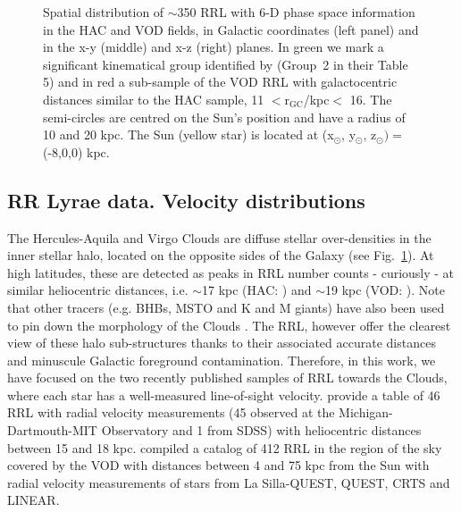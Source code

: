 \documentclass[a4paper,useAMS,usenatbib]{mnras}
\begin{document}
\begin{figure}
	\vspace{-0.55cm}
    \caption{Spatial distribution of $\sim$350 RRL with 6-D phase
      space information in the HAC and VOD fields, in Galactic
      coordinates (left panel) and in the x-y (middle) and x-z (right)
      planes. In green we mark a significant kinematical group
      identified by \citet{Vivas2016} (Group~2 in their Table 5) and
      in red a sub-sample of the VOD RRL with galactocentric distances
      similar to the HAC sample, 11 $<\mathrm{r_{GC}}$/kpc$<$
      16. The semi-circles are centred on the Sun's position and have
      a radius of 10 and 20 kpc. The Sun (yellow star) is located at
      (x$_{\odot}$, y$_{\odot}$, z$_{\odot})= $ (-8,0,0) kpc.}
    \label{fig:lb}
\end{figure}
%
\subsection{RR Lyrae data. Velocity distributions}
%
The Hercules-Aquila and Virgo Clouds are diffuse stellar
over-densities in the inner stellar halo, located on the opposite
sides of the Galaxy (see Fig.~\ref{fig:lb}). At high latitudes,
these are detected as peaks in RRL number counts - curiously - at
similar heliocentric distances, i.e. $\sim$17 kpc (HAC:
\citealt{Wa09,Simion2014}) and $\sim$19 kpc (VOD: \citealt{Vivas2006,
  Duffau2014, Vivas2016}). Note that other tracers (e.g. BHBs, MSTO
and K and M giants) have also been used to pin down the morphology of
the Clouds \citep[see
  e.g.][]{Be07,Juric2008,Sharma2010,Bonaca2012,Conroy2018}. The RRL, however offer the clearest view of these halo sub-structures
thanks to their associated accurate distances and minuscule Galactic
foreground contamination. Therefore, in this work, we have focused on
the two recently published samples of RRL towards the Clouds,
where each star has a well-measured line-of-sight
velocity. \citet{Simion2018} provide a table of 46 RRL with radial
velocity measurements (45 observed at the Michigan-Dartmouth-MIT
Observatory and 1 from SDSS) with heliocentric distances between 15
and 18 kpc. \cite{Vivas2016} compiled a catalog of 412 RRL in the
region of the sky covered by the VOD with distances between 4 and 75
kpc from the Sun with radial velocity measurements of stars from La
Silla-QUEST, QUEST, CRTS and LINEAR.
\end{document}
